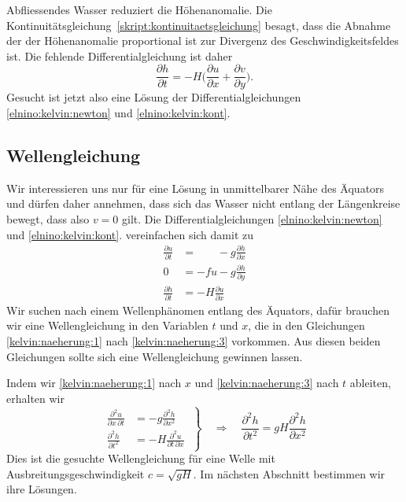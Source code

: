 Abfliessendes Wasser reduziert die Höhenanomalie.
Die Kontinuitätsgleichung~\eqref{skript:kontinuitaetsgleichung}
besagt, dass die Abnahme der der Höhenanomalie proportional ist zur
Divergenz des Geschwindigkeitsfeldes ist.
Die fehlende Differentialgleichung ist daher
\begin{equation}
\frac{\partial h}{\partial t}
=
-H\biggl(
\frac{\partial u}{\partial x} + \frac{\partial v}{\partial y}
\biggr).
\label{elnino:kelvin:kont}
\end{equation}
Gesucht ist jetzt also eine Lösung der Differentialgleichungen
\eqref{elnino:kelvin:newton} und \eqref{elnino:kelvin:kont}.

\subsection{Wellengleichung}
Wir interessieren uns nur für eine Lösung in unmittelbarer Nähe des
Äquators und dürfen daher annehmen, dass sich das Wasser nicht
entlang der Längenkreise bewegt, dass also $v=0$ gilt.
Die Differentialgleichungen
\eqref{elnino:kelvin:newton} und \eqref{elnino:kelvin:kont}.
vereinfachen sich damit zu
\begin{align}
\frac{\partial u}{\partial t}
&=
\phantom{-fu}
 - g\frac{\partial h}{\partial x}
\label{kelvin:naeherung:1}
\\
0
&=
-fu - g\frac{\partial h}{\partial y}
\label{kelvin:naeherung:2}
\\
\frac{\partial h}{\partial t}
&=
-H
\frac{\partial u}{\partial x}
\label{kelvin:naeherung:3}
\end{align}
Wir suchen nach einem Wellenphänomen entlang des Äquators, dafür
brauchen wir eine Wellengleichung in den Variablen $t$ und $x$,
die in den Gleichungen \eqref{kelvin:naeherung:1} nach
\eqref{kelvin:naeherung:3} vorkommen.
Aus diesen beiden Gleichungen sollte sich eine Wellengleichung
gewinnen lassen.

Indem wir \eqref{kelvin:naeherung:1} nach $x$ und 
\eqref{kelvin:naeherung:3} nach $t$ ableiten, erhalten wir
\begin{equation}
\left.
\begin{aligned}
\frac{\partial^2 u}{\partial x\,\partial t}
&=
-g\frac{\partial^2h}{\partial x^2}
\\
\frac{\partial^2 h}{\partial t^2}
&=
-H\frac{\partial^2 u}{\partial t\,\partial x}
\end{aligned}
\;
\right\}
\quad
\Rightarrow
\quad
\frac{\partial^2 h}{\partial t^2}
=
gH\frac{\partial^2 h}{\partial x^2}
\label{kelvin:wellengleichung}
\end{equation}
Dies ist die gesuchte Wellengleichung für eine Welle mit
Ausbreitungsgeschwindigkeit $c=\sqrt{gH}$.
Im nächsten Abschnitt bestimmen wir ihre Lösungen.


